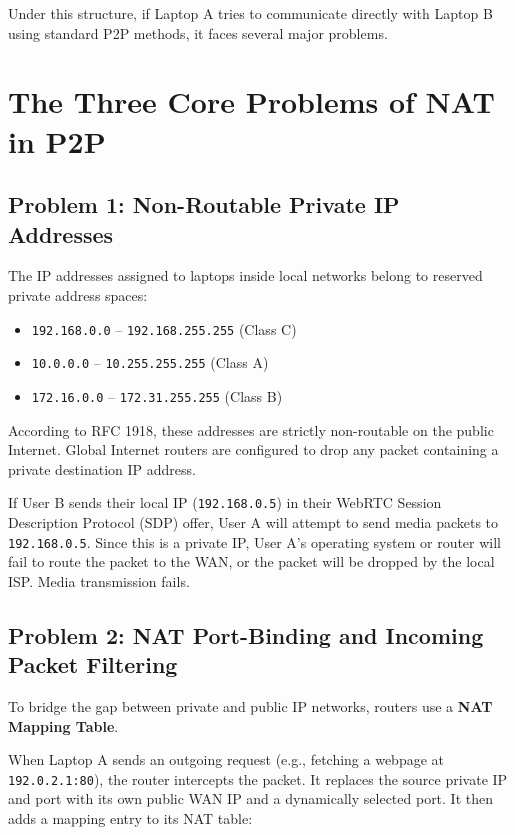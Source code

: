 \documentclass[11pt,a4paper]{article}
\begin{document}
Under this structure, if Laptop A tries to communicate directly with Laptop B using standard P2P methods, it faces several major problems.

\section{The Three Core Problems of NAT in P2P}

\subsection{Problem 1: Non-Routable Private IP Addresses}
The IP addresses assigned to laptops inside local networks belong to reserved private address spaces:
\begin{itemize}
    \item \texttt{192.168.0.0} -- \texttt{192.168.255.255} (Class C)
    \item \texttt{10.0.0.0} -- \texttt{10.255.255.255} (Class A)
    \item \texttt{172.16.0.0} -- \texttt{172.31.255.255} (Class B)
\end{itemize}

According to RFC 1918, these addresses are strictly non-routable on the public Internet. Global Internet routers are configured to drop any packet containing a private destination IP address. 

If User B sends their local IP (\texttt{192.168.0.5}) in their WebRTC Session Description Protocol (SDP) offer, User A will attempt to send media packets to \texttt{192.168.0.5}. Since this is a private IP, User A's operating system or router will fail to route the packet to the WAN, or the packet will be dropped by the local ISP. Media transmission fails.

\subsection{Problem 2: NAT Port-Binding and Incoming Packet Filtering}
To bridge the gap between private and public IP networks, routers use a \textbf{NAT Mapping Table}. 

When Laptop A sends an outgoing request (e.g., fetching a webpage at \texttt{192.0.2.1:80}), the router intercepts the packet. It replaces the source private IP and port with its own public WAN IP and a dynamically selected port. It then adds a mapping entry to its NAT table:
\end{document}
